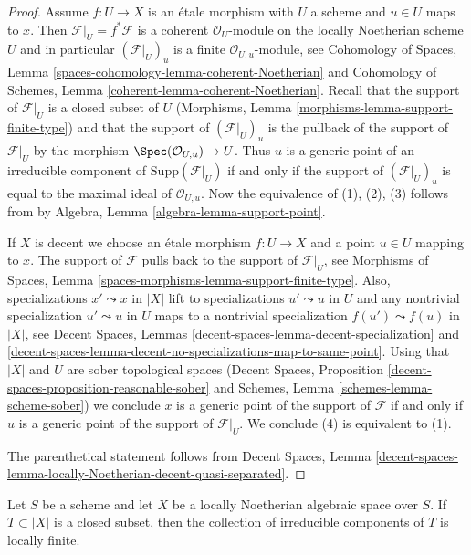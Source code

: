 \begin{proof}
Assume $f : U \to X$ is an \'etale morphism with $U$ a scheme
and $u \in U$ maps to $x$. Then $\mathcal{F}|_U = f^*\mathcal{F}$
is a coherent $\mathcal{O}_U$-module on the locally Noetherian
scheme $U$ and in particular $(\mathcal{F}|_U)_u$ is a finite
$\mathcal{O}_{U, u}$-module, see Cohomology of Spaces, Lemma
\ref{spaces-cohomology-lemma-coherent-Noetherian}
and Cohomology of Schemes, Lemma
\ref{coherent-lemma-coherent-Noetherian}.
Recall that the support of $\mathcal{F}|_U$ is a closed subset of $U$
(Morphisms, Lemma \ref{morphisms-lemma-support-finite-type}) and
that the support of $(\mathcal{F}|_U)_u$ is the pullback
of the support of $\mathcal{F}|_U$ by the morphism
$\Spec(\mathcal{O}_{U, u}) \to U$. Thus $u$ is a generic point
of an irreducible component of $\text{Supp}(\mathcal{F}|_U)$
if and only if the support of $(\mathcal{F}|_U)_u$ is equal
to the maximal ideal of $\mathcal{O}_{U, u}$.
Now the equivalence of (1), (2), (3) follows from
by Algebra, Lemma \ref{algebra-lemma-support-point}.

\medskip\noindent
If $X$ is decent we choose an \'etale morphism $f : U \to X$ and a point
$u \in U$ mapping to $x$. The support of $\mathcal{F}$ pulls back to
the support of $\mathcal{F}|_U$, see
Morphisms of Spaces, Lemma \ref{spaces-morphisms-lemma-support-finite-type}.
Also, specializations $x' \leadsto x$ in $|X|$ lift to specializations
$u' \leadsto u$ in $U$ and any nontrivial specialization $u' \leadsto u$ in $U$
maps to a nontrivial specialization $f(u') \leadsto f(u)$ in $|X|$, see
Decent Spaces, Lemmas
\ref{decent-spaces-lemma-decent-specialization} and
\ref{decent-spaces-lemma-decent-no-specializations-map-to-same-point}.
Using that $|X|$ and $U$ are sober topological spaces
(Decent Spaces, Proposition \ref{decent-spaces-proposition-reasonable-sober}
and
Schemes, Lemma \ref{schemes-lemma-scheme-sober}) we conclude
$x$ is a generic point of the support of $\mathcal{F}$
if and only if $u$ is a generic point of the support of
$\mathcal{F}|_U$. We conclude (4) is equivalent to (1).

\medskip\noindent
The parenthetical statement follows from Decent Spaces, Lemma
\ref{decent-spaces-lemma-locally-Noetherian-decent-quasi-separated}.
\end{proof}

\begin{lemma}
\label{lemma-components-locally-finite}
Let $S$ be a scheme and let $X$ be a locally Noetherian
algebraic space over $S$. If $T \subset |X|$ is a closed subset,
then the collection of irreducible components of $T$ is locally finite.
\end{lemma}

